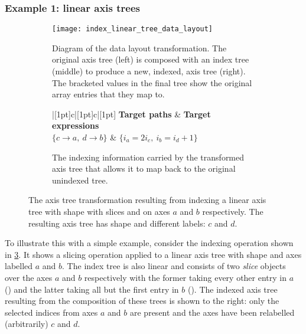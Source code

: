 \documentclass[thesis]{subfiles}
\begin{document}
\subsubsection{Example 1: linear axis trees}

\begin{figure}
  \centering
  \begin{subfigure}{\textwidth}
    \centering
    \texttt{[image: index\_linear\_tree\_data\_layout]}
    \caption{
      Diagram of the data layout transformation.
      The original axis tree (left) is composed with an index tree (middle) to produce a new, indexed, axis tree (right).
      The bracketed values in the final tree show the original array entries that they map to.
    }
    \label{fig:index_linear_tree_data_layout}
  \end{subfigure}

  \vspace{1em}

  \begin{subfigure}{\textwidth}
    \centering
    \begin{tblr}{|[1pt]c|[1pt]c|[1pt]}
      \hline[1pt]
      \textbf{Target paths} & \textbf{Target expressions} \\
      \hline[1pt]
      $\{c \to a,\ d \to b\}$ & $\{i_a = 2 i_c,\ i_b = i_d+1\}$ \\
      \hline[1pt]
    \end{tblr}
    \caption{
      The indexing information carried by the transformed axis tree that allows it to map back to the original unindexed tree.
    }
    \label{fig:index_linear_tree_exprs}
  \end{subfigure}

  \caption{
    The axis tree transformation resulting from indexing a linear axis tree with shape  with slices \pycode{[::2]} and \pycode{[1::]} on axes $a$ and $b$ respectively.
    The resulting axis tree has shape  and different labels: $c$ and $d$.
  }
  \label{fig:index_linear_tree_all}
\end{figure}

To illustrate this with a simple example, consider the indexing operation shown in \cref{fig:index_linear_tree_all}.
It shows a slicing operation applied to a linear axis tree with shape  and axes labelled $a$ and $b$.
The index tree is also linear and consists of two \textit{slice} objects over the axes $a$ and $b$ respectively with the former taking every other entry in $a$ (\pycode{[::2]}) and the latter taking all but the first entry in $b$ (\pycode{[1::]}).
The indexed axis tree resulting from the composition of these trees is shown to the right: only the selected indices from axes $a$ and $b$ are present and the axes have been relabelled (arbitrarily) $c$ and $d$.
\end{document}
